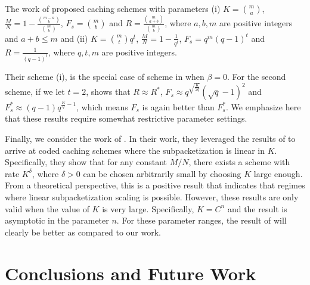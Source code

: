 \documentclass[journal,twocolumn]{IEEEtran}
\theoremstyle{definition}
\begin{document}
%

The work of \cite{shangguan2016centralized} proposed caching schemes with parameters (i) $K=\binom{m}{a}$, $\frac{M}{N}=1-\frac{\binom{m-a}{b}}{\binom{m}{b}}$, $F_s=\binom{m}{b}$ and $R=\frac{\binom{m}{a+b}}{\binom{m}{b}}$, where $a,b,m$ are positive integers and $a+b\le m$ and (ii) $K=\binom{m}{t}q^t$, $\frac{M}{N}=1-\frac{1}{q^t}$, $F_s=q^m(q-1)^t$ and $R=\frac{1}{(q-1)^t}$, where $q,t,m$ are positive integers.

Their scheme (i), is the special case of scheme in \cite{yan2016placement} when $\beta=0$. For the second scheme, if we let $t=2$, \cite{shangguan2016centralized} shows that $R\approx R^*$, $F_s\approx q^{\sqrt{\frac{K}{2q}}}(\sqrt{q}-1)^2$ and $F_s^*\approx (q-1)q^{\frac{K}{q}-1}$, which means $F_s$ is again better than $F_s^*$. We emphasize here that these results require somewhat restrictive parameter settings.

Finally, we consider the work of \cite{shanmugam2017coded}. In their work, they leveraged the results of \cite{alon2012nearly} to arrive at coded caching schemes where the subpacketization is linear in $K$. Specifically, they show that for any constant $M/N$, there exists a scheme with rate $K^\delta$, where $\delta > 0$ can be chosen arbitrarily small by choosing $K$ large enough. From a theoretical perspective, this is a positive result that indicates that regimes where linear subpacketization scaling is possible. However, these results are only valid when the value of $K$ is very large. Specifically, $K = C^n$ and the result is asymptotic in the parameter $n$. For these parameter ranges, the result of \cite{shanmugam2017coded} will clearly be better as compared to our work.



\section{Conclusions and Future Work}
\label{sec:conclusion}
\end{document}
